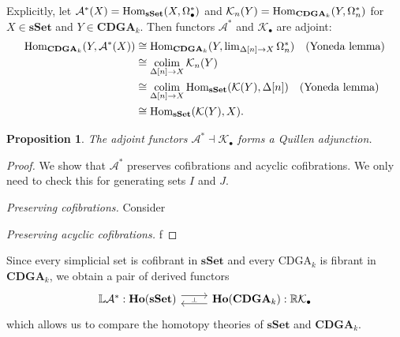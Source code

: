 \documentclass[psamsfonts]{amsart}
\newtheorem{prop}[thm]{Proposition}
\theoremstyle{definition}
\theoremstyle{remark}
\newcommand{\Hom}{\textup{Hom}}
\newcommand{\CDGA}{\mathbf{CDGA}}
\newcommand{\Ho}{\mathbf{Ho}}
\newcommand{\sSet}{\mathbf{sSet}}
\DeclareMathOperator*\colim{colim}
\numberwithin{equation}{section}
\begin{document}
Explicitly, let $\mathcal{A}^\ast(X)=\Hom_{\sSet}(X,\Omega^\ast_\bullet)$ and $\mathcal{K}_n(Y)=\Hom_{\CDGA_k}(Y,\Omega_n^\ast)$ for $X\in\sSet$ and $Y\in\CDGA_k$. Then functors $\mathcal{A}^\ast$ and $\mathcal{K}_\bullet$ are adjoint:
\begin{align*}
\Hom_{\CDGA_k}(Y,\mathcal{A}^\ast(X))&\cong\Hom_{\CDGA_k}(Y,\textstyle{\lim_{\Delta[n]\to X}\Omega_n^\ast})\quad\textrm{(Yoneda lemma)}\\
&\cong\colim_{\Delta[n]\to X}\mathcal{K}_n(Y)\\
&\cong\colim_{\Delta[n]\to X}\Hom_{\sSet}(\mathcal{K}(Y),\Delta[n])\quad\textrm{(Yoneda lemma)}\\
&\cong\Hom_{\sSet}(\mathcal{K}(Y),X).
\end{align*}

\begin{prop}
The adjoint functors $\mathcal{A}^\ast\dashv\mathcal{K}_\bullet$ forms a Quillen adjunction.
\end{prop}
\begin{proof}
We show that $\mathcal{A}^\ast$ preserves cofibrations and acyclic cofibrations. We only need to check this for generating sets $I$ and $J$.\medbreak

\textit{Preserving cofibrations.} Consider\medbreak

\textit{Preserving acyclic cofibrations.} f
\end{proof}

Since every simplicial set is cofibrant in $\sSet$ and every CDGA$_k$ is fibrant in $\CDGA_k$, we obtain a pair of derived functors
\[\begin{tikzcd}
	{\mathbb{L}\mathcal{A}^\ast:\Ho(\sSet)} & {\Ho(\CDGA_k):\mathbb{R}\mathcal{K}_\bullet}
	\arrow[""{name=0, anchor=center, inner sep=0}, shift left=1.5, from=1-1, to=1-2]
	\arrow[""{name=1, anchor=center, inner sep=0}, shift left=1.5, from=1-2, to=1-1]
	\arrow["\dashv"{anchor=center, rotate=-90}, draw=none, from=0, to=1]
\end{tikzcd}\]
which allows us to compare the homotopy theories of $\sSet$ and $\CDGA_k$.
\end{document}
